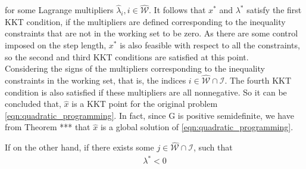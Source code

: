 for some Lagrange multipliers $\hat{\lambda}_i,i \in \hat{\mathcal{W}}$.  It follows that $x^*$ and $\lambda^*$ satisfy the first KKT condition, if the multipliers are defined corresponding to the inequality constraints that are not in the working set to be zero. As there are some control imposed on the step length, $x^*$ is also feasible with respect to all the constraints, so the second and third KKT conditions are satisfied at this point.\\

Considering the signs of the multipliers corresponding to the inequality constraints in the working set, that is, the indices $i\in \hat{\mathcal{W}} \cap \mathcal{I}$. The fourth KKT condition is also satisfied if these multipliers are all nonnegative. So it can be concluded that, $\hat{x}$ is a KKT point for the original problem \ref{eqn:quadratic_programming}. In fact, since G is positive semidefinite, we have from Theorem *** that $\hat{x}$ is a global solution of \ref{eqn:quadratic_programming}.

If on the other hand, if there exists some $j \in \hat{\mathcal{W}}\cap \mathcal{I}$, such that
\begin{equation*}
	\begin{aligned}
		\lambda^* < 0
	\end{aligned}
\end{equation*}

